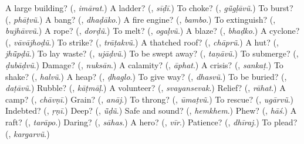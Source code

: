 \begin{tcolorbox}[breakable,colback=teal!4,colframe=teal!35!black,title={Before you move on}]
A large building? (\textbf{}, \emph{imārat}.) A ladder? (\textbf{}, \emph{sīḍī}.) To choke? (\textbf{}, \emph{gū̃gḷāvũ}.) To burst? (\textbf{}, \emph{phāṭvũ}.) A bang? (\textbf{}, \emph{dhaḍāko}.) A fire engine? (\textbf{}, \emph{bambo}.) To extinguish? (\textbf{}, \emph{bujhāvvũ}.) A rope? (\textbf{}, \emph{dorḍũ}.) To melt? (\textbf{}, \emph{ogaḷvũ}.) A blaze? (\textbf{}, \emph{bhaḍko}.) A cyclone? (\textbf{}, \emph{vāvājhoḍũ}.) To strike? (\textbf{}, \emph{trāṭakvũ}.) A thatched roof? (\textbf{}, \emph{chāprũ}.) A hut? (\textbf{}, \emph{jhū̃pḍũ}.) To lay waste? (\textbf{}, \emph{ujāḍvũ}.) To be swept away? (\textbf{}, \emph{taṇāvũ}.) To submerge? (\textbf{}, \emph{ḍubāḍvũ}.) Damage? (\textbf{}, \emph{nuksān}.) A calamity? (\textbf{}, \emph{āphat}.) A crisis? (\textbf{}, \emph{sankaṭ}.) To shake? (\textbf{}, \emph{halvũ}.) A heap? (\textbf{}, \emph{ḍhaglo}.) To give way? (\textbf{}, \emph{dhasvũ}.) To be buried? (\textbf{}, \emph{daṭāvũ}.) Rubble? (\textbf{}, \emph{kāṭmāḷ}.) A volunteer? (\textbf{}, \emph{svayansevak}.) Relief? (\textbf{}, \emph{rāhat}.) A camp? (\textbf{}, \emph{chāvṇī}.) Grain? (\textbf{}, \emph{anāj}.) To throng? (\textbf{}, \emph{ūmaṭvũ}.) To rescue? (\textbf{}, \emph{ugārvũ}.) Indebted? (\textbf{}, \emph{ṛṇī}.) Deep? (\textbf{}, \emph{ū̃ḍũ}.) Safe and sound? (\textbf{}, \emph{hemkhem}.) Phew? (\textbf{}, \emph{hāś}.) A raft? (\textbf{}, \emph{tarāpo}.) Daring? (\textbf{}, \emph{sāhas}.) A hero? (\textbf{}, \emph{vīr}.) Patience? (\textbf{}, \emph{dhīraj}.) To plead? (\textbf{}, \emph{kargarvũ}.)
\end{tcolorbox}
